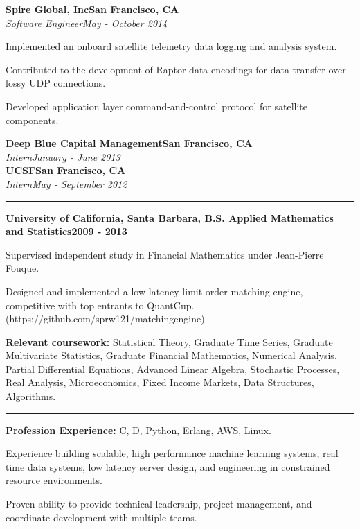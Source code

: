 \documentclass{article}
\newcommand{\ressection}[1]{\noindent{\large\textbf{#1}}\vspace{2pt}\hrule\vspace{4pt}}
\newcommand{\leftandright}[2]{\noindent\textbf{#1}\hfill\textbf{#2}}
\newcommand{\leftandrighti}[2]{\indent\textit{#1}\hfill\textit{#2}}
\begin{document}
\leftandright{Spire Global, Inc}{San Francisco, CA} \\
\leftandrighti{Software Engineer}{May - October 2014}

\begin{itemize*}
\item Implemented an onboard satellite telemetry data logging and analysis system.
\item Contributed to the development of Raptor data encodings for data transfer over
  lossy UDP connections.
\item Developed application layer command-and-control protocol for satellite components.
\end{itemize*}

\leftandright{Deep Blue Capital Management}{San Francisco, CA} \\
\leftandrighti{Intern}{January - June 2013}\\

\leftandright{UCSF}{San Francisco, CA} \\
\leftandrighti{Intern}{May - September 2012}

\ressection{Education}

\leftandright{University of California, Santa Barbara, \textmd{B.S. Applied
    Mathematics and Statistics}}{2009 - 2013}
\begin{itemize*}
\item Supervised independent study in Financial Mathematics under Jean-Pierre Fouque.
\item Designed and implemented a low latency limit order matching engine,
  competitive with top entrants to QuantCup.
  (https://github.com/sprw121/matching\textunderscore engine)
\item \textbf{Relevant coursework:} Statistical Theory, Graduate Time Series,
  Graduate Multivariate Statistics, Graduate Financial Mathematics,
  Numerical Analysis, Partial Differential Equations,
  Advanced Linear Algebra, Stochastic Processes, Real Analysis,
  Microeconomics, Fixed Income Markets, Data Structures, Algorithms.
\end{itemize*}

\vspace{1.0em}

\vspace{1.0em}

\ressection{Skills}

\begin{itemize*}
\item \textbf{Profession Experience:} C, D, Python, Erlang, AWS, Linux.
\item Experience building scalable, high performance machine learning systems,
  real time data systems, low latency server design, and engineering in
  constrained resource environments.
\item Proven ability to provide technical leadership, project management,
  and coordinate development with multiple teams.
\end{itemize*}
\end{document}
